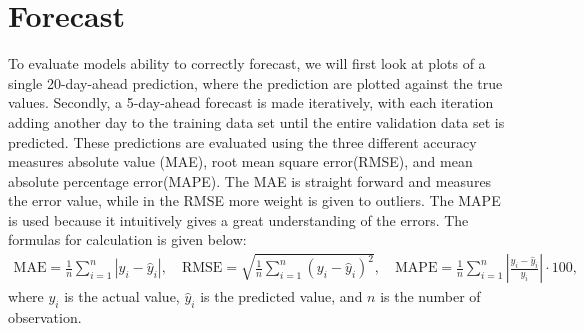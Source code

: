 \section{Forecast}
To evaluate models ability to correctly forecast, we will first look at plots of a single 20-day-ahead prediction, where the prediction are plotted against the true values. Secondly, a 5-day-ahead forecast is made iteratively, with each iteration adding another day to the training data set until the entire validation data set is predicted. These predictions are evaluated using the three different accuracy measures absolute value (MAE), root mean square error(RMSE), and mean absolute percentage error(MAPE). The MAE is straight forward and measures the error value, while in the RMSE more weight is given to outliers. The MAPE is used because it intuitively gives a great understanding of the errors. The formulas for calculation is given below:
\begin{align*}
    \text{MAE} = \frac{1}{n} \sum_{i=1}^{n} |y_i - \hat{y}_i|, \quad \text{RMSE} = \sqrt{\frac{1}{n} \sum_{i=1}^{n} (y_i - \hat{y}_i)^2}, \quad \text{MAPE} = \frac{1}{n} \sum_{i=1}^{n} \left| \frac{y_i - \hat{y}_i}{y_i} \right|\cdot 100,
\end{align*}
\noindent where $y_i$ is the actual value, $\hat{y}_i$ is the predicted value, and $n$ is the number of observation.

